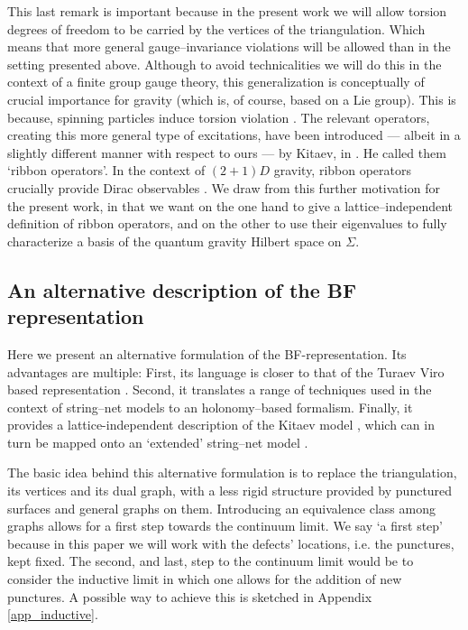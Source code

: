 \documentclass[nofootinbib,superscriptaddress,eqsecnum,tightenlines,11pt]{revtex4-1}
\begin{document}
This last remark is important because in the present work we will allow torsion degrees of freedom to be carried by the vertices of the triangulation. 
Which means that more general gauge--invariance violations will be allowed than in the setting presented above.
Although to avoid technicalities we will do this in the context of a finite group gauge theory, this generalization is conceptually of crucial importance for gravity (which is, of course, based on a Lie group).
This is because, spinning particles induce torsion violation \cite{Sousa,Louapre1}.
The relevant operators, creating this more general type of excitations, have been introduced --- albeit in a slightly different manner with respect to ours --- by Kitaev, in \cite{Kitaev1}.
He called them `ribbon operators'.
In the context of $(2+1)D$ gravity, ribbon operators crucially provide Dirac observables \cite{FreiZap}.
We draw from this further motivation for the present work, in that we want on the one hand to give a lattice--independent definition of ribbon operators, and on the other to use their eigenvalues to fully characterize a basis of the quantum gravity Hilbert space on $\Sigma$.



\subsection{An alternative description of the BF representation}\label{sec_alBF}

Here we present an alternative formulation of the BF-representation.
Its advantages are multiple:
First, its language is closer to that of the Turaev Viro based representation \cite{DG16}.
Second, it translates a range of techniques used in the context of string--net models \cite{LevinWen, Hu} to an holonomy--based formalism.
Finally, it provides a lattice-independent description of the Kitaev model \cite{Kitaev1}, which can in turn be mapped onto an `extended' string--net model \cite{Buersch}.

The basic idea behind this alternative formulation is to replace the triangulation, its vertices and its dual graph, with a less rigid structure provided by punctured surfaces and general graphs on them.
Introducing an equivalence class among graphs allows for a first step towards the continuum limit.
We say `a first step' because in this paper we will work  with the defects' locations, i.e. the punctures, kept fixed.
The second, and last, step to the continuum limit would be to consider the inductive limit in which one allows for the addition of new punctures. 
A possible way to achieve this is sketched in Appendix \ref{app_inductive}.
\end{document}
